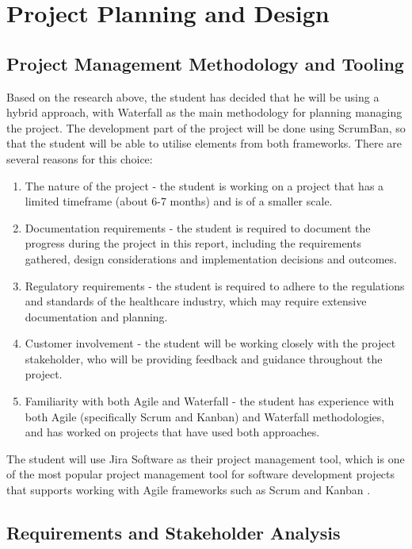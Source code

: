 \chapter{Project Planning and Design}

\section{Project Management Methodology and Tooling}

Based on the research above, the student has decided that he will be using a hybrid approach, with Waterfall as the main methodology for planning managing the project. The development part of the project will be done using ScrumBan, so that the student will be able to utilise elements from both frameworks. There are several reasons for this choice:

\begin{enumerate}
    \item The nature of the project - the student is working on a project that has a limited timeframe (about 6-7 months) and is of a smaller scale. 
    \item Documentation requirements - the student is required to document the progress during the project in this report, including the requirements gathered, design considerations and implementation decisions and outcomes. 
    \item Regulatory requirements - the student is required to adhere to the regulations and standards of the healthcare industry, which may require extensive documentation and planning.
    \item Customer involvement - the student will be working closely with the project stakeholder, who will be providing feedback and guidance throughout the project.
    \item Familiarity with both Agile and Waterfall - the student has experience with both Agile (specifically Scrum and Kanban) and Waterfall methodologies, and has worked on projects that have used both approaches.
\end{enumerate}

The student will use Jira Software as their project management tool, which is one of the most popular project management tool for software development projects that supports working with Agile frameworks such as Scrum and Kanban \parencite{atlassian}.

\section{Requirements and Stakeholder Analysis}


